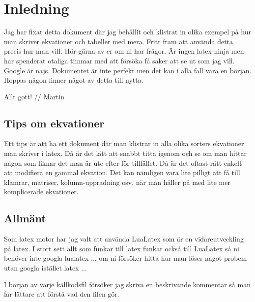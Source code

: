 


\section*{Inledning}
Jag har fixat detta dokument där jag behållit och klistrat in olika exempel på hur man skriver ekvationer och tabeller med mera. Fritt fram att använda detta precis hur man vill. Hör gärna av er om ni har frågor. Är ingen latex-ninja men har spenderat otaliga timmar med att försöka få saker att se ut som jag vill. Google är najs. Dokumentet är inte perfekt men det kan i alla fall vara en början. Hoppas någon finner något av detta till nytta. 

Allt gott! // Martin

\subsection*{Tips om ekvationer}
Ett tips är att ha ett dokument där man klistrar in alla olika sorters ekvationer man skriver i latex. Då är det lätt att snabbt titta igenom och se om man hittar någon som liknar det man är ute efter för tillfället. Då är det oftast rätt enkelt att modifiera en gammal ekvation. Det kan nämligen vara lite pilligt att få till klamrar, matriser, kolumn-uppradning osv. när man håller på med lite mer komplicerade ekvationer.

\subsection*{Allmänt}
Som latex motor har jag valt att använda LuaLatex som är en vidareutveckling på latex. I stort sett allt som funkar till latex funkar också till LuaLatex så ni behöver inte googla lualatex ... om ni försöker hitta hur man löser något probem utan googla istället latex ... 

I början av varje källkodsfil försöker jag skriva en beskrivande kommentar så man får lättare att förstå vad den filen gör. 

